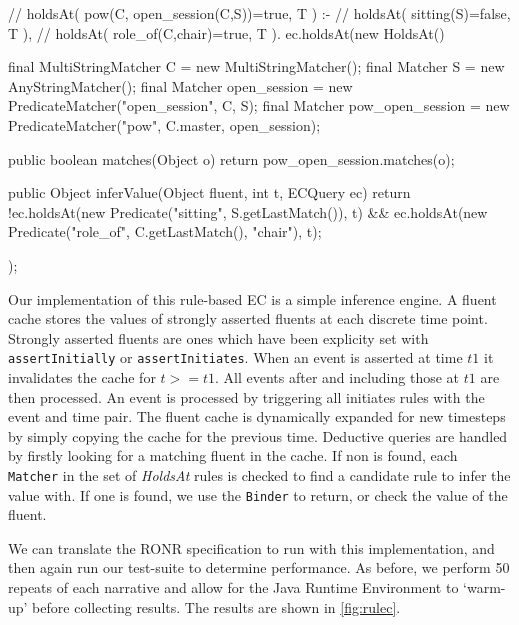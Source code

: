 \begin{java}[label=lst:holdsAt,caption={[Example of \emph{holdsAt} rule]Example of \emph{holdsAt} rule. The \texttt{matches} function filters fluents which match the form we're looking for. If the fluent matches, \texttt{inferValue} determines the value based on the status of other fluents and using matched values from the specified fluent.}]
// holdsAt( pow(C, open_session(C,S))=true, T ) :-
//    holdsAt( sitting(S)=false, T ),
//    holdsAt( role_of(C,chair)=true, T ).
ec.holdsAt(new HoldsAt() {
	final MultiStringMatcher C = new MultiStringMatcher();
	final Matcher S = new AnyStringMatcher();
	final Matcher open_session = new PredicateMatcher("open_session",
			C, S);
	final Matcher pow_open_session = new PredicateMatcher("pow",
			C.master, open_session);

	public boolean matches(Object o) {
				return pow_open_session.matches(o);
			}

	public Object inferValue(Object fluent, int t, ECQuery ec) {
		return !ec.holdsAt(new Predicate("sitting", S.getLastMatch()), t)
				&& ec.holdsAt(new Predicate("role_of",
						C.getLastMatch(), "chair"), t);
	}
});
\end{java}

Our implementation of this rule-based \ac{EC} is a simple inference
engine. A fluent cache stores the values of strongly asserted fluents at each
discrete time point. Strongly asserted fluents are ones which have been
explicity set with \texttt{assertInitially} or \texttt{assertInitiates}. When
an event is asserted at time $\mathit{t1}$ it invalidates the cache for $t >= \mathit{t1}$. All
events after and including those at $\mathit{t1}$ are then processed. An event is
processed by triggering all initiates rules with the event and time pair. The
fluent cache is dynamically expanded for new timesteps by simply copying the
cache for the previous time. Deductive queries are handled by firstly looking
for a matching fluent in the cache. If non is found, each \texttt{Matcher} in
the set of \emph{HoldsAt} rules is checked to find a candidate rule to infer the value
with. If one is found, we use the \texttt{Binder} to return, or check the value
of the fluent.

We can translate the \ac{RONR} specification to run with this implementation,
and then again run our test-suite to determine performance. As before, we
perform 50 repeats of each narrative and allow for the Java Runtime
Environment to `warm-up' before collecting results. The results are shown in \autoref{fig:rulec}.

